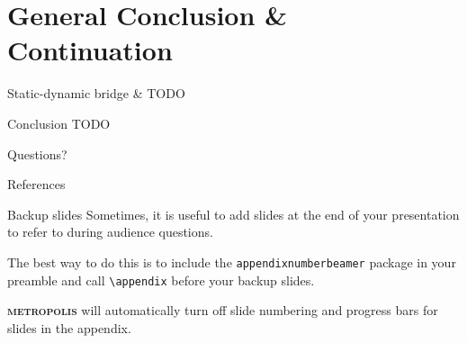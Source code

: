 \documentclass[12pt,aspectratio=169]{beamer}
\newcommand{\themename}{\textbf{\textsc{metropolis}}\xspace}
\begin{document}
%
%
%
\section{General Conclusion \& Continuation}

\begin{frame}{Static-dynamic bridge \& }
  TODO
\end{frame}

\begin{frame}{Conclusion}
  TODO
\end{frame}



{
\begin{frame}[standout]
  Questions?
\end{frame}
}

\appendix

\begin{frame}[allowframebreaks]{References}
  \printbibliography[heading=none]
\end{frame}

\begin{frame}[fragile]{Backup slides}
  Sometimes, it is useful to add slides at the end of your presentation to
  refer to during audience questions.

  The best way to do this is to include the \verb|appendixnumberbeamer|
  package in your preamble and call \verb|\appendix| before your backup slides.

  \themename will automatically turn off slide numbering and progress bars for
  slides in the appendix.
\end{frame}
\end{document}
